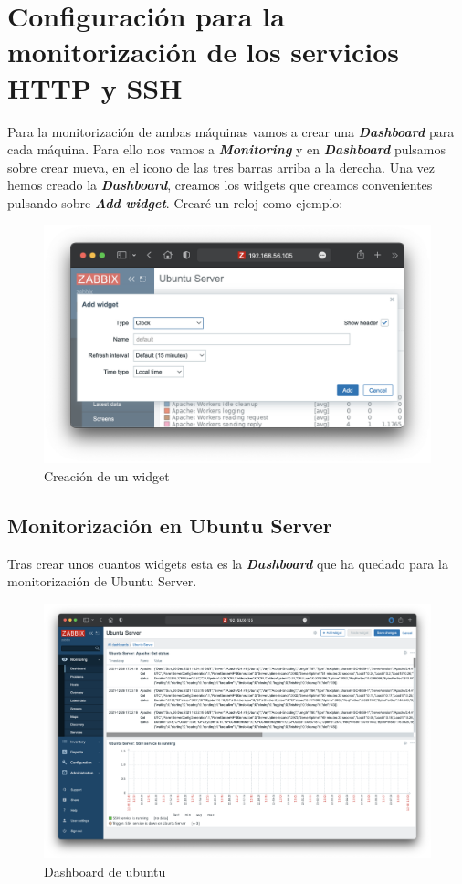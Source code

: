 \section{Configuración para la monitorización de los servicios HTTP y SSH}
Para la monitorización de ambas máquinas vamos a crear una \textbf{\emph{Dashboard}} para cada máquina. Para ello nos vamos a \textbf{\emph{Monitoring}} y en \textbf{\emph{Dashboard}} pulsamos sobre
crear nueva, en el icono de las tres barras arriba a la derecha. Una vez hemos creado la \textbf{\emph{Dashboard}}, creamos los widgets que creamos convenientes pulsando sobre
\textbf{\emph{Add widget}}. Crearé un reloj como ejemplo:
    \begin{figure}[H]
        \centering
        \includegraphics[scale=0.3]{images/widget.png}
        \caption{Creación de un widget}
        \label{fig:widget}
    \end{figure}

\subsection{Monitorización en Ubuntu Server}
Tras crear unos cuantos widgets esta es la \textbf{\emph{Dashboard}} que ha quedado para la monitorización de Ubuntu Server.
    \begin{figure}[H]
        \centering
        \includegraphics[scale=0.275]{images/ubuntu_dashboard.png}
        \caption{Dashboard de ubuntu}
        \label{fig:ubuntu_dashboard}
    \end{figure}

